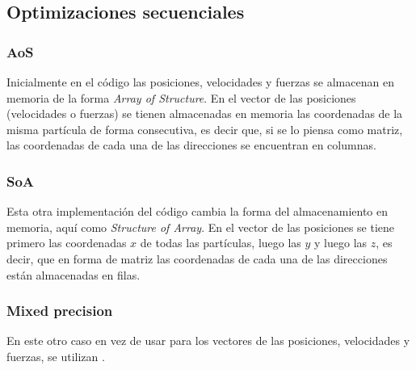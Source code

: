 \documentclass[a4paper,spanish,12pt,twoside]{article}
\begin{document}
\subsection{Optimizaciones secuenciales}

\subsubsection*{AoS}

Inicialmente en el código las posiciones, velocidades y fuerzas se almacenan en memoria de la forma \textit{Array of Structure}. En el vector de las posiciones (velocidades o fuerzas) se tienen almacenadas en memoria las coordenadas de la misma partícula de forma consecutiva, es decir que, si se lo piensa como matriz, las coordenadas de cada una de las direcciones se encuentran en columnas.

\subsubsection*{SoA}

Esta otra implementación del código cambia la forma del almacenamiento en memoria, aquí como \textit{Structure of Array}. En el vector de las posiciones se tiene primero las coordenadas $x$ de todas las partículas, luego las $y$ y luego las $z$, es decir, que en forma de matriz las coordenadas de cada una de las direcciones están almacenadas en filas.

\subsubsection*{Mixed precision}

En este otro caso en vez de usar  para los vectores de las posiciones, velocidades y fuerzas, se utilizan .

\
\end{document}
